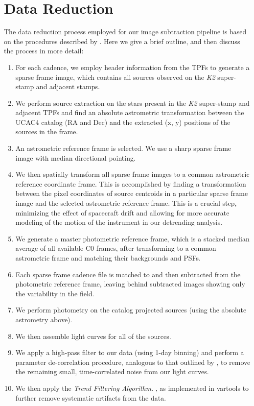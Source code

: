 \documentclass[apjl]{emulateapj}
\begin{document}
\section{Data Reduction}
\label{sec:reduction}
The data reduction process employed for our image subtraction pipeline
is based on the procedures described by \citet{Huang:2015}.  Here we
give a brief outline, and then discuss the process in more detail:
\begin{enumerate}
\item For each cadence, we employ header information from the TPFs
  to generate a sparse frame image, which contains all sources observed
  on the \textit{K2} super-stamp and adjacent stamps.
\item We perform source extraction on the stars present in the
  \textit{K2} super-stamp and adjacent TPFs and find an absolute
  astrometric transformation between the UCAC4 catalog (RA and Dec)
  and the extracted (x, y) positions of the sources in the frame.
\item An astrometric reference frame is selected. We use a sharp sparse
  frame image with median directional pointing.
\item We then spatially transform all sparse frame images to a common
  astrometric reference coordinate frame. This is accomplished by
  finding a transformation between the pixel coordinates of source
  centroids in a particular sparse frame image and the selected
  astrometric reference frame. This is a crucial step, minimizing the
  effect of spacecraft drift and allowing for more accurate modeling of
  the motion of the instrument in our detrending analysis.
\item We generate a master photometric reference frame, which is a
  stacked median average of all available C0 frames, after transforming
  to a common astrometric frame and matching their backgrounds and PSFs.
\item Each sparse frame cadence file is matched to and then subtracted
  from the photometric reference frame, leaving behind subtracted images
  showing only the variability in the field.
\item We perform photometry on the catalog projected sources (using
    the absolute astrometry above).
\item We then assemble light curves for all of the sources.
\item We apply a high-pass filter to our data (using 1-day binning) and
  perform a parameter de-correlation procedure, analogous to that
  outlined by \citet{vanderburg_johnson:2014}, to remove the remaining
  small, time-correlated
  noise from our light curves.
\item We then apply the \textit{Trend Filtering Algorithm}.
  \citep{Kovacs:2005}, as implemented in {\sc vartools}
  \citep{Hartman:2016} to further remove systematic artifacts from the
  data.
\end{enumerate}
  
\end{document}
